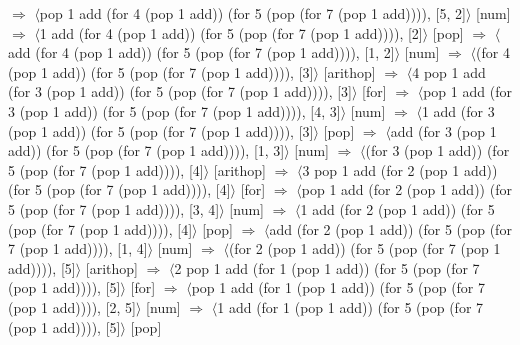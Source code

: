 \documentclass[12pt]{report}
\begin{document}
$\Rightarrow$ $\langle$pop 1 add (for 4 (pop 1 add)) (for 5 (pop (for 7 (pop 1 add)))), [5, 2]$\rangle$ \hfill [num] \newline
$\Rightarrow$ $\langle$1 add (for 4 (pop 1 add)) (for 5 (pop (for 7 (pop 1 add)))), [2]$\rangle$ \hfill [pop] \newline
$\Rightarrow$ $\langle$add (for 4 (pop 1 add)) (for 5 (pop (for 7 (pop 1 add)))), [1, 2]$\rangle$ \hfill [num] \newline
$\Rightarrow$ $\langle$(for 4 (pop 1 add)) (for 5 (pop (for 7 (pop 1 add)))), [3]$\rangle$ \hfill [arithop] \newline
$\Rightarrow$ $\langle$4 pop 1 add (for 3 (pop 1 add)) (for 5 (pop (for 7 (pop 1 add)))), [3]$\rangle$ \hfill [for] \newline
$\Rightarrow$ $\langle$pop 1 add (for 3 (pop 1 add)) (for 5 (pop (for 7 (pop 1 add)))), [4, 3]$\rangle$ \hfill [num] \newline
$\Rightarrow$ $\langle$1 add (for 3 (pop 1 add)) (for 5 (pop (for 7 (pop 1 add)))), [3]$\rangle$ \hfill [pop] \newline
$\Rightarrow$ $\langle$add (for 3 (pop 1 add)) (for 5 (pop (for 7 (pop 1 add)))), [1, 3]$\rangle$ \hfill [num] \newline
$\Rightarrow$ $\langle$(for 3 (pop 1 add)) (for 5 (pop (for 7 (pop 1 add)))), [4]$\rangle$ \hfill [arithop] \newline
$\Rightarrow$ $\langle$3 pop 1 add (for 2 (pop 1 add)) (for 5 (pop (for 7 (pop 1 add)))), [4]$\rangle$ \hfill [for] \newline
$\Rightarrow$ $\langle$pop 1 add (for 2 (pop 1 add)) (for 5 (pop (for 7 (pop 1 add)))), [3, 4]$\rangle$ \hfill [num] \newline
$\Rightarrow$ $\langle$1 add (for 2 (pop 1 add)) (for 5 (pop (for 7 (pop 1 add)))), [4]$\rangle$ \hfill [pop] \newline
$\Rightarrow$ $\langle$add (for 2 (pop 1 add)) (for 5 (pop (for 7 (pop 1 add)))), [1, 4]$\rangle$ \hfill [num] \newline
$\Rightarrow$ $\langle$(for 2 (pop 1 add)) (for 5 (pop (for 7 (pop 1 add)))), [5]$\rangle$ \hfill [arithop] \newline
$\Rightarrow$ $\langle$2 pop 1 add (for 1 (pop 1 add)) (for 5 (pop (for 7 (pop 1 add)))), [5]$\rangle$ \hfill [for] \newline
$\Rightarrow$ $\langle$pop 1 add (for 1 (pop 1 add)) (for 5 (pop (for 7 (pop 1 add)))), [2, 5]$\rangle$ \hfill [num] \newline
$\Rightarrow$ $\langle$1 add (for 1 (pop 1 add)) (for 5 (pop (for 7 (pop 1 add)))), [5]$\rangle$ \hfill [pop] \newline
\end{document}
